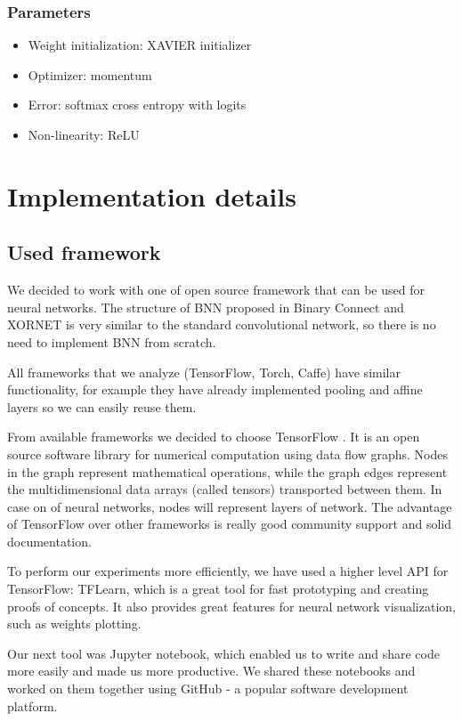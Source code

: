 \documentclass[licencjacka]{pracamgr}
\begin{document}
		\subsection{Parameters}
			\begin{itemize}
 			\item Weight initialization: XAVIER initializer
 			\item Optimizer: momentum 
 			\item Error: softmax cross entropy with logits
 			\item Non-linearity: ReLU
			\end{itemize}


\chapter{Implementation details}

	\section{Used framework}

		We decided to work with one of open source framework that can be used for neural networks. The structure of BNN proposed in Binary Connect \cite{binaryConnect} and XORNET \cite{xornet} is very similar to the standard convolutional network, so there is no need to implement BNN from scratch. 
		
		All frameworks that we analyze (TensorFlow, Torch, Caffe) have similar functionality, for example they have already implemented pooling and affine layers so we can easily reuse them. 

		From available frameworks we decided to choose TensorFlow \cite{tensorFlow}. It is an open source software library for numerical computation using data flow graphs. Nodes in the graph represent mathematical operations, while the graph edges represent the multidimensional data arrays (called tensors) transported between them. In case on of neural networks, nodes will represent layers of network. 
		The advantage of TensorFlow over other frameworks is really good community support and solid documentation.
		
		To perform our experiments more efficiently, we have used a higher level API for TensorFlow: TFLearn, which is a great tool for fast prototyping and creating proofs of concepts. It also provides great features for neural network visualization, such as weights plotting.
		
		Our next tool was Jupyter notebook, which enabled us to write and share code more easily and made us more productive. We shared these notebooks and worked on them together using GitHub - a popular software development platform.
\end{document}
